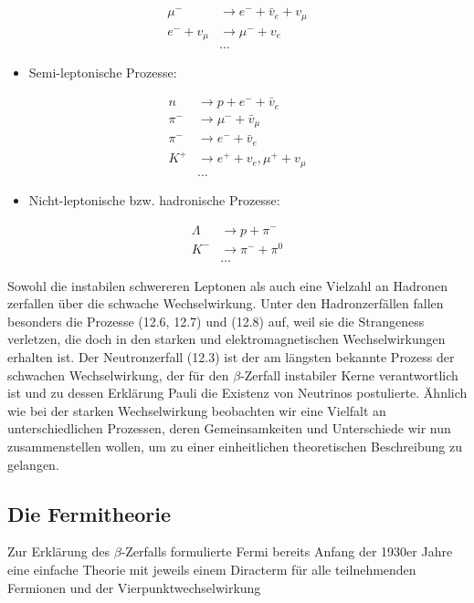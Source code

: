\documentclass[10pt, letterpaper]{article}
\begin{document}
$$
\begin{aligned}
\mu^{-} & \rightarrow e^{-}+\bar{v}_{e}+v_{\mu} \\
e^{-}+v_{\mu} & \rightarrow \mu^{-}+v_{e} \\
& \ldots
\end{aligned}
$$

\begin{itemize}
  \item Semi-leptonische Prozesse:
\end{itemize}

$$
\begin{aligned}
n & \rightarrow p+e^{-}+\bar{v}_{e} \\
\pi^{-} & \rightarrow \mu^{-}+\bar{v}_{\mu} \\
\pi^{-} & \rightarrow e^{-}+\bar{v}_{e} \\
K^{+} & \rightarrow e^{+}+v_{e}, \mu^{+}+v_{\mu} \\
& \ldots
\end{aligned}
$$

\begin{itemize}
  \item Nicht-leptonische bzw. hadronische Prozesse:
\end{itemize}

$$
\begin{aligned}
\Lambda & \rightarrow p+\pi^{-} \\
K^{-} & \rightarrow \pi^{-}+\pi^{0} \\
& \ldots
\end{aligned}
$$

Sowohl die instabilen schwereren Leptonen als auch eine Vielzahl an Hadronen zerfallen über die schwache Wechselwirkung. Unter den Hadronzerfällen fallen besonders die Prozesse (12.6, 12.7) und (12.8) auf, weil sie die Strangeness verletzen, die doch in den starken und elektromagnetischen Wechselwirkungen erhalten ist. Der Neutronzerfall (12.3) ist der am längsten bekannte Prozess der schwachen Wechselwirkung, der für den $\beta$-Zerfall instabiler Kerne verantwortlich ist und zu dessen Erklärung Pauli die Existenz von Neutrinos postulierte. Ähnlich wie bei der starken Wechselwirkung beobachten wir eine Vielfalt an unterschiedlichen Prozessen, deren Gemeinsamkeiten und Unterschiede wir nun zusammenstellen wollen, um zu einer einheitlichen theoretischen Beschreibung zu gelangen.

\subsection*{Die Fermitheorie}
Zur Erklärung des $\beta$-Zerfalls formulierte Fermi bereits Anfang der 1930er Jahre eine einfache Theorie mit jeweils einem Diracterm für alle teilnehmenden Fermionen und der Vierpunktwechselwirkung
\end{document}
